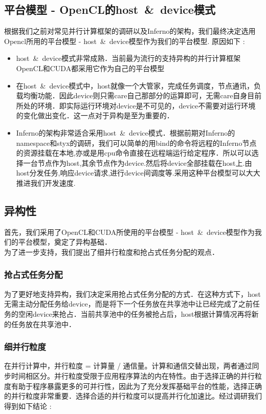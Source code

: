 \documentclass[paper=a4]{ctexart} %
\numberwithin{equation}{section} %
\numberwithin{figure}{section} %
\numberwithin{table}{section} %
\newcommand{\n}{\\\indent}
\begin{document}
\subsection{平台模型 - OpenCL的host~\&~device模式}
根据我们之前对常见并行计算框架的调研以及Inferno的架构，我们最终决定选用Opencl所用的平台模型 - host~\&~device模型作为我们的平台模型. 原因如下 : 
\begin{itemize}
\item host~\&~device模式非常成熟．当前最为流行的支持异构的并行计算框架OpenCL和CUDA都采用它作为自己的平台模型
\item 在host~\&~device模式中，host就像一个大管家，完成任务调度，节点通讯，负载均衡功能．因此device则只需care自己那部分的运算即可，无需care自身目前所处的环境．即实际运行环境对device是不可见的，device不需要对运行环境的变化做出变化．这一点对于异构是至为重要的．
\item Inferno的架构非常适合采用host~\&~device模式．根据前期对Inferno的namespace和styx的调研，我们可以简单的用bind的命令将远程的Inferno节点的资源挂载在本地,亦或是用cpu命令直接在远程端运行给定程序．所以可以选择一台节点作为host,其余节点作为device.然后将device全部挂载在host上.由host分发任务,响应device请求,进行device间调度等.采用这种平台模型可以大大推进我们开发速度.
\end{itemize}

\subsection{异构性}
首先，我们采用了OpenCL和CUDA所使用的平台模型 - host~\&~device模型作为我们的平台模型，奠定了异构基础．\n
为了进一步支持，我们提出了细并行粒度和抢占式任务分配的观点．

\subsubsection{抢占式任务分配}
为了更好地支持异构，我们决定采用抢占式任务分配的方式．在这种方式下，host无需主动分配任务给device，而是将下一个任务放在共享池中让已经完成了之前任务的空闲device来抢占．当前共享池中的任务被抢占后，host根据计算情况再将新的任务放在共享池中．

\subsubsection{细并行粒度}
在并行计算中，并行粒度 = 计算量 / 通信量。计算和通信交替出现，两者通过同步时间相区分。并行粒度受限于应用程序算法的内在特性。由于选择正确的并行粒度有助于程序暴露更多的可并行性，因此为了充分发挥基础平台的性能，选择正确的并行粒度非常重要．选择合适的并行粒度可以提高并行化加速比。经过调研我们得到如下结论 : 
\end{document}
